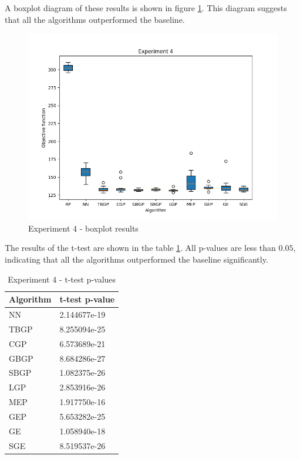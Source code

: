A boxplot diagram of these results is shown in figure \ref{fig:experiment4}. This diagram suggests that all the algorithms outperformed the baseline.

\begin{figure}[!htbp]
	\centering
	\includegraphics[scale=0.7]{../images/experiment4.png}
	\caption{Experiment 4 - boxplot results}
    \label{fig:experiment4}
\end{figure}

The results of the t-test are shown in the table \ref{tab:experiment4_stat}. All p-values are less than $0.05$, indicating that all the algorithms outperformed the baseline significantly.

\begin{table}[!htbp]
    \begin{center}
        \begin{tabular}{|l|l|} 
         \hline
            Algorithm & t-test p-value \\ [0.5ex] \hline\hline
            NN & 2.144677e-19 \\
            \hline
            TBGP & 8.255094e-25 \\
            \hline
            CGP & 6.573689e-21 \\
            \hline
            GBGP & 8.684286e-27 \\
            \hline
            SBGP & 1.082375e-26 \\
            \hline
            LGP & 2.853916e-26 \\
            \hline
            MEP & 1.917750e-16 \\
            \hline
            GEP & 5.653282e-25 \\
            \hline
            GE & 1.058940e-18 \\
            \hline
            SGE & 8.519537e-26 \\
            \hline
        \end{tabular}
    \end{center}
    \caption{Experiment 4 - t-test p-values}
\label{tab:experiment4_stat}
\end{table}

